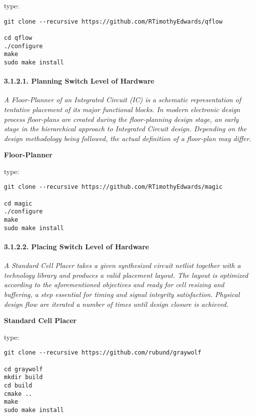 \documentclass[]{article}
\let\oldparagraph\paragraph
\renewcommand{\paragraph}[1]{\oldparagraph{#1}\mbox{}}
\begin{document}
type:

\begin{verbatim}
git clone --recursive https://github.com/RTimothyEdwards/qflow

cd qflow
./configure
make
sudo make install
\end{verbatim}

\hypertarget{planning-switch-level-of-hardware}{%
\paragraph{3.1.2.1. Planning Switch Level of
Hardware}\label{planning-switch-level-of-hardware}}

\emph{A Floor-Planner of an Integrated Circuit (IC) is a schematic
representation of tentative placement of its major functional blocks. In
modern electronic design process floor-plans are created during the
floor-planning design stage, an early stage in the hierarchical approach
to Integrated Circuit design. Depending on the design methodology being
followed, the actual definition of a floor-plan may differ.}

\textbf{Floor-Planner}

type:

\begin{verbatim}
git clone --recursive https://github.com/RTimothyEdwards/magic

cd magic
./configure
make
sudo make install
\end{verbatim}

\hypertarget{placing-switch-level-of-hardware}{%
\paragraph{3.1.2.2. Placing Switch Level of
Hardware}\label{placing-switch-level-of-hardware}}

\emph{A Standard Cell Placer takes a given synthesized circuit netlist
together with a technology library and produces a valid placement
layout. The layout is optimized according to the aforementioned
objectives and ready for cell resizing and buffering, a step essential
for timing and signal integrity satisfaction. Physical design flow are
iterated a number of times until design closure is achieved.}

\textbf{Standard Cell Placer}

type:

\begin{verbatim}
git clone --recursive https://github.com/rubund/graywolf

cd graywolf
mkdir build
cd build
cmake ..
make
sudo make install
\end{verbatim}
\end{document}
